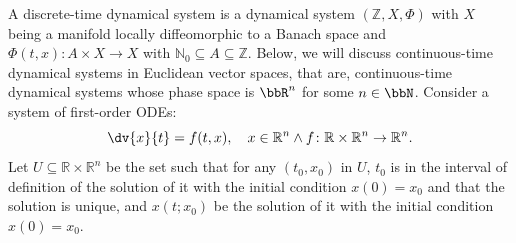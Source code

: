 \documentclass[a4paper,12pt]{report}
\begin{document}
A discrete-time dynamical system is a dynamical system $(\mathbb{Z}, X, \Phi)$ with $X$ being a manifold locally diffeomorphic to a Banach space and $\Phi(t,x)\colon A\times X\to X$ with $\mathbb{N}_0\subseteq A\subseteq\mathbb{Z}$.
Below, we will discuss continuous-time dynamical systems in Euclidean vector spaces, that are, continuous-time dynamical systems whose phase space is $\bbR^n$ for some $n\in\bbN$.
Consider a system of first-order ODEs:
\[\dv{x}{t}=f(t,x), \quad x\in\mathbb{R}^n\land f\colon\mathbb{R}\times\mathbb{R}^n\to\mathbb{R}^n.\]
Let $U\subseteq\mathbb{R}\times\mathbb{R}^n$ be the set such that for any $(t_0,x_0)$ in $U$, $t_0$ is in the interval of definition of the solution of it with the initial condition $x(0)=x_0$ and that the solution is unique, and $x(t;x_0)$ be the solution of it with the initial condition $x(0)=x_0$.
\end{document}
